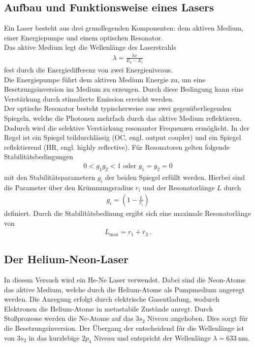\subsection{Aufbau und Funktionsweise eines Lasers}
Ein Laser besteht aus drei grundlegenden Komponenten: dem aktiven Medium, einer Energiepumpe und einem optischen Resonator.\\
Das aktive Medium legt die Wellenlänge des Laserstrahls
\begin{align}
    \lambda = \frac{h c}{E_k - E_i} \label{eqn:Wellenlange}
\end{align} 
fest durch die Energiedifferenz von zwei Energieniveaus.\\
Die Energiepumpe führt dem aktiven Medium Energie zu, um eine Besetzungsinversion im Medium zu erzeugen. Durch diese Bedingung kann eine Verstärkung durch stimulierte Emission erreicht werden.\\
Der optische Resonator besteht typischerweise aus zwei gegenüberliegenden Spiegeln, welche die Photonen mehrfach durch das aktive Medium reflektieren.
Dadurch wird die selektive Verstärkung resonanter Frequenzen ermöglicht. In der Regel ist ein Spiegel teildurchlässig (OC, engl. output coupler) und ein Spiegel reflektierend (HR, engl. highly reflective).
Für Resonatoren gelten folgende Stabilitätsbedingungen 
\begin{align}
    0 < g_1 g_2 < 1\text{ oder } g_1 = g_2 = 0 \label{eqn:Stabilitaetsbedingung}
\end{align}
mit den Stabilitätsparametern $g_i$ der beiden Spiegel erfüllt werden. Hierbei sind die Parameter über den Krümmungsradius $r_i$ und der Resonatorlänge $L$ durch
\begin{align}
    g_i = \left(1- \frac{L}{r_i}\right)\label{eqn:stabilitaetsparameter}
\end{align}
definiert. 
Durch die Stabilitätsbedinung ergibt sich eine maximale Resonatorlänge von
\begin{align}
    L_{\text{max}} = r_1 + r_2\,.\label{eqn:maximaleResonatorlaenge}
\end{align}
\cite{laserspektroskopie}

\subsection{Der Helium-Neon-Laser}
In diesem Versuch wird ein He-Ne Laser verwendet. Dabei sind die Neon-Atome das aktive Medium, welche durch die Helium-Atome als Pumpmedium angeregt werden. 
Die Anregung erfolgt durch elektrische Gasentladung, wodurch Elektronen die Helium-Atome in metastabile Zustände anregt. Durch Stoßprozesse werden die Ne-Atome auf das $3s_2$ Niveau angehoben. 
Dies sorgt für die Besetzungsinversion. 
Der Übergang der entscheidend für die Wellenlänge ist von $3s_2$ in das kurzlebige $2p_4$ Niveau und entspricht der Wellenlänge $\lambda = \SI{633}{\nano\meter}$. \cite{laser} \cite{leifiLaser}


